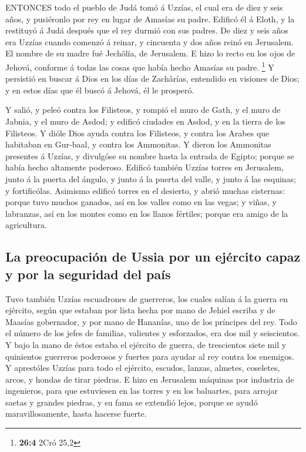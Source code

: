  ENTONCES todo el pueblo de Judá tomó á Uzzías, el cual era
de diez y seis años, y pusiéronlo por rey en lugar de Amasías su padre.
 Edificó él á Eloth, y la restituyó á Judá después que el
rey durmió con sus padres.  De diez y seis años era Uzzías
cuando comenzó á reinar, y cincuenta y dos años reinó en Jerusalem. El
nombre de su madre fué Jechôlía, de Jerusalem.  E hizo lo
recto en los ojos de Jehová, conforme á todas las cosas que había hecho
Amasías su padre. \footnote{\textbf{26:4} 2Cró 25,2}  Y
persistió en buscar á Dios en los días de Zachârías, entendido en
visiones de Dios; y en estos días que él buscó á Jehová, él le prosperó.

 Y salió, y peleó contra los Filisteos, y rompió el muro de
Gath, y el muro de Jabnia, y el muro de Asdod; y edificó ciudades en
Asdod, y en la tierra de los Filisteos.  Y dióle Dios ayuda
contra los Filisteos, y contra los Arabes que habitaban en Gur-baal, y
contra los Ammonitas.  Y dieron los Ammonitas presentes á
Uzzías, y divulgóse su nombre hasta la entrada de Egipto; porque se
había hecho altamente poderoso.  Edificó también Uzzías
torres en Jerusalem, junto á la puerta del ángulo, y junto á la puerta
del valle, y junto á las esquinas; y fortificólas. 
Asimismo edificó torres en el desierto, y abrió muchas cisternas: porque
tuvo muchos ganados, así en los valles como en las vegas; y viñas, y
labranzas, así en los montes como en los llanos fértiles; porque era
amigo de la agricultura.

\hypertarget{la-preocupaciuxf3n-de-ussia-por-un-ejuxe9rcito-capaz-y-por-la-seguridad-del-pauxeds}{%
\subsection{La preocupación de Ussia por un ejército capaz y por la
seguridad del
país}\label{la-preocupaciuxf3n-de-ussia-por-un-ejuxe9rcito-capaz-y-por-la-seguridad-del-pauxeds}}

 Tuvo también Uzzías escuadrones de guerreros, los cuales
salían á la guerra en ejército, según que estaban por lista hecha por
mano de Jehiel escriba y de Maasías gobernador, y por mano de Hananías,
uno de los príncipes del rey.  Todo el número de los jefes
de familias, valientes y esforzados, era dos mil y seiscientos.
 Y bajo la mano de éstos estaba el ejército de guerra, de
trescientos siete mil y quinientos guerreros poderosos y fuertes para
ayudar al rey contra los enemigos.  Y aprestóles Uzzías
para todo el ejército, escudos, lanzas, almetes, coseletes, arcos, y
hondas de tirar piedras.  E hizo en Jerusalem máquinas por
industria de ingenieros, para que estuviesen en las torres y en los
baluartes, para arrojar saetas y grandes piedras, y su fama se extendió
lejos, porque se ayudó maravillosamente, hasta hacerse fuerte.

